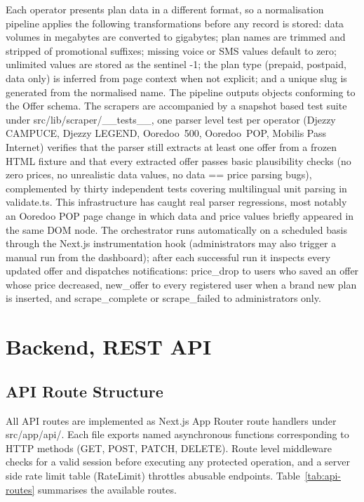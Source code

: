 Each operator presents plan data in a different format, so a normalisation pipeline applies the following transformations before any record is stored: data volumes in megabytes are converted to gigabytes; plan names are trimmed and stripped of promotional suffixes; missing voice or SMS values default to zero; unlimited values are stored as the sentinel -1; the plan type (prepaid, postpaid, data only) is inferred from page context when not explicit; and a unique slug is generated from the normalised name. The pipeline outputs objects conforming to the Offer schema. The scrapers are accompanied by a snapshot based test suite under src/lib/scraper/\_\_tests\_\_, one parser level test per operator (Djezzy CAMPUCE, Djezzy LEGEND, Ooredoo~500, Ooredoo~POP, Mobilis Pass Internet) verifies that the parser still extracts at least one offer from a frozen HTML fixture and that every extracted offer passes basic plausibility checks (no zero prices, no unrealistic data values, no \guillemotleft{}data == price\guillemotright{} parsing bugs), complemented by thirty independent tests covering multilingual unit parsing in validate.ts. This infrastructure has caught real parser regressions, most notably an Ooredoo POP page change in which data and price values briefly appeared in the same DOM node. The orchestrator runs automatically on a scheduled basis through the Next.js instrumentation hook (administrators may also trigger a manual run from the dashboard); after each successful run it inspects every updated offer and dispatches notifications: price\_drop to users who saved an offer whose price decreased, new\_offer to every registered user when a brand new plan is inserted, and scrape\_complete or scrape\_failed to administrators only.

\section{Backend, REST API}

\subsection{API Route Structure}

All API routes are implemented as Next.js App Router route handlers under src/app/api/. Each file exports named asynchronous functions corresponding to HTTP methods (GET, POST, PATCH, DELETE). Route level middleware checks for a valid session before executing any protected operation, and a server side rate limit table (RateLimit) throttles abusable endpoints. Table~\ref{tab:api-routes} summarises the available routes.

